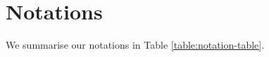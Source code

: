 

\clearpage

\section{Notations}\label{sec:notation-table}

We summarise our notations in Table \ref{table:notation-table}.


\begin{table*}[!htbp]
\begin{scriptsize}
\begin{center}
\footnotesize{
\caption{ \small{Notation Table}.}\label{commu-breakdown-party} 
\renewcommand{\arraystretch}{1}
}
\end{center}
\end{scriptsize}
\end{table*}
